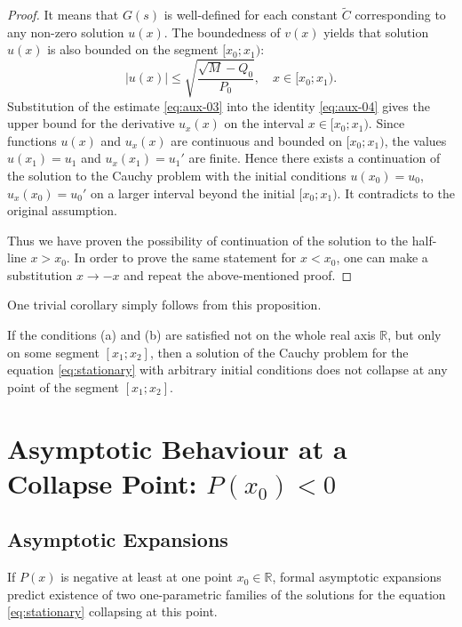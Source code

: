 \begin{proof}
	It means that $G(s)$ is well-defined for each constant $\widetilde{C}$ corresponding to any non-zero solution $u(x)$.
	The boundedness of $v(x)$ yields that solution $u(x)$ is also bounded on the segment $[x_0; x_1)$:
	\begin{equation}
		|u(x)| \le \sqrt{\dfrac{\sqrt{M} - Q_0}{P_0}}, \quad x \in [x_0; x_1).
		\label{eq:aux-03}
	\end{equation}
	Substitution of the estimate \eqref{eq:aux-03} into the identity \eqref{eq:aux-04} gives the upper bound for the derivative $u_{x}(x)$ on the interval $x \in [x_0; x_1)$.
	Since functions $u(x)$ and $u_{x}(x)$ are continuous and bounded on $[x_0; x_1)$, the values $u(x_1) = u_1$ and $u_{x}(x_1) = u_1'$ are finite.
	Hence there exists a continuation of the solution to the Cauchy problem with the initial conditions $u(x_0) = u_0$, $u_{x}(x_0) = u_0'$ on a larger interval beyond the initial $[x_0; x_1)$.
	It contradicts to the original assumption.
	
	Thus we have proven the possibility of continuation of the solution to the half-line $x > x_0$.
	In order to prove the same statement for $x < x_0$, one can make a substitution $x \to -x$ and repeat the above-mentioned proof.
\end{proof}

One trivial corollary simply follows from this proposition.
\begin{corollary}
	If the conditions (a) and (b) are satisfied not on the whole real axis $\mathbb{R}$, but only on some segment $[x_1; x_2]$, then a solution of the Cauchy problem for the equation \eqref{eq:stationary} with arbitrary initial conditions does not collapse at any point of the segment $[x_1; x_2]$.
\end{corollary}

\section{Asymptotic Behaviour at a Collapse Point: $P(x_0) < 0$}

\subsection{Asymptotic Expansions}

If $P(x)$ is negative at least at one point $x_0 \in \mathbb{R}$, formal asymptotic expansions predict existence of two one-parametric families of the solutions for the equation \eqref{eq:stationary} collapsing at this point.

